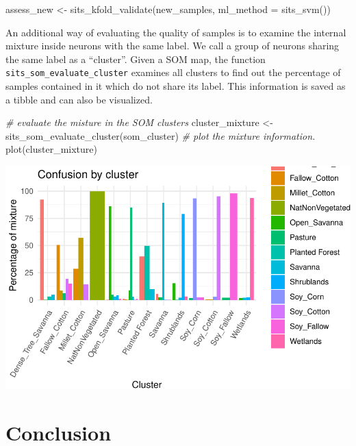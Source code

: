 \documentclass[a4paper,]{tufte-book}
\newenvironment{Shaded}{}{}
\newcommand{\AttributeTok}[1]{\textcolor[rgb]{0.49,0.56,0.16}{#1}}
\newcommand{\CommentTok}[1]{\textcolor[rgb]{0.38,0.63,0.69}{\textit{#1}}}
\newcommand{\FunctionTok}[1]{\textcolor[rgb]{0.02,0.16,0.49}{#1}}
\newcommand{\NormalTok}[1]{#1}
\newcommand{\OtherTok}[1]{\textcolor[rgb]{0.00,0.44,0.13}{#1}}
\begin{document}
\begin{Shaded}
\begin{Highlighting}[]
\NormalTok{assess\_new }\OtherTok{\textless{}{-}} \FunctionTok{sits\_kfold\_validate}\NormalTok{(new\_samples, }
                                   \AttributeTok{ml\_method =} \FunctionTok{sits\_svm}\NormalTok{())}
\end{Highlighting}
\end{Shaded}

An additional way of evaluating the quality of samples is to examine the internal
mixture inside neurons with the same label. We call a group of neurons sharing
the same label as a ``cluster''. Given a SOM map, the function \texttt{sits\_som\_evaluate\_cluster}
examines all clusters to find out the percentage of samples contained in it which do not share its label. This information is saved as a tibble and can also
be visualized.

\begin{Shaded}
\begin{Highlighting}[]
\CommentTok{\# evaluate the misture in the SOM clusters}
\NormalTok{cluster\_mixture }\OtherTok{\textless{}{-}} \FunctionTok{sits\_som\_evaluate\_cluster}\NormalTok{(som\_cluster)}
\CommentTok{\# plot the mixture information.}
\FunctionTok{plot}\NormalTok{(cluster\_mixture)}
\end{Highlighting}
\end{Shaded}

\begin{center}\includegraphics[width=0.7\linewidth]{sitsbook_files/figure-latex/unnamed-chunk-43-1} \end{center}

\hypertarget{conclusion}{%
\section{Conclusion}\label{conclusion}}
\end{document}
